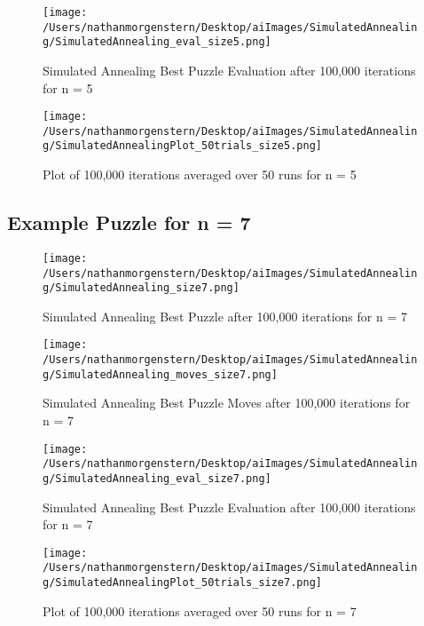 \documentclass{report}
\begin{document}
	\begin{figure}[H]
	\centering
	\texttt{[image: /Users/nathanmorgenstern/Desktop/aiImages/SimulatedAnnealing/SimulatedAnnealing\_eval\_size5.png]}
	\caption{Simulated Annealing Best Puzzle Evaluation after 100,000 iterations for n = 5} 
	\label{fig: Simulated Annealing Best Puzzle Evaluation after 100,000 iterations for n = 5} 
	\end{figure}

	\begin{figure}[H]
	\centering
	\texttt{[image: /Users/nathanmorgenstern/Desktop/aiImages/SimulatedAnnealing/SimulatedAnnealingPlot\_50trials\_size5.png]}
	\caption{Plot of 100,000 iterations averaged over 50 runs for n = 5}
	\label{fig: Plot of 100,000 iterations averaged over 50 runs for n = 5}
	\end{figure}

\subsection{Example Puzzle for n = 7}

	\begin{figure}[H]
	\centering
	\texttt{[image: /Users/nathanmorgenstern/Desktop/aiImages/SimulatedAnnealing/SimulatedAnnealing\_size7.png]}
	\caption{Simulated Annealing Best Puzzle after 100,000 iterations for n = 7} 
	\label{fig: Simulated Annealing Best Puzzle after 100,000 iterations for n = 7}
	\end{figure}
	
	\begin{figure}[H]
	\centering
	\texttt{[image: /Users/nathanmorgenstern/Desktop/aiImages/SimulatedAnnealing/SimulatedAnnealing\_moves\_size7.png]}
	\caption{Simulated Annealing Best Puzzle Moves after 100,000 iterations for n = 7} 
	\label{fig: Simulated Annealing Best Puzzle Moves after 100,000 iterations for n = 7}
	\end{figure}

	\begin{figure}[H]
	\centering
	\texttt{[image: /Users/nathanmorgenstern/Desktop/aiImages/SimulatedAnnealing/SimulatedAnnealing\_eval\_size7.png]}
	\caption{Simulated Annealing Best Puzzle Evaluation after 100,000 iterations for n = 7} 
	\label{fig: Simulated Annealing Best Puzzle Evaluation after 100,000 iterations for n = 7} 
	\end{figure}

	\begin{figure}[H]
	\centering
	\texttt{[image: /Users/nathanmorgenstern/Desktop/aiImages/SimulatedAnnealing/SimulatedAnnealingPlot\_50trials\_size7.png]}
	\caption{Plot of 100,000 iterations averaged over 50 runs for n = 7}
	\label{fig: Plot of 100,000 iterations averaged over 50 runs for n = 7}
	\end{figure}
\end{document}
